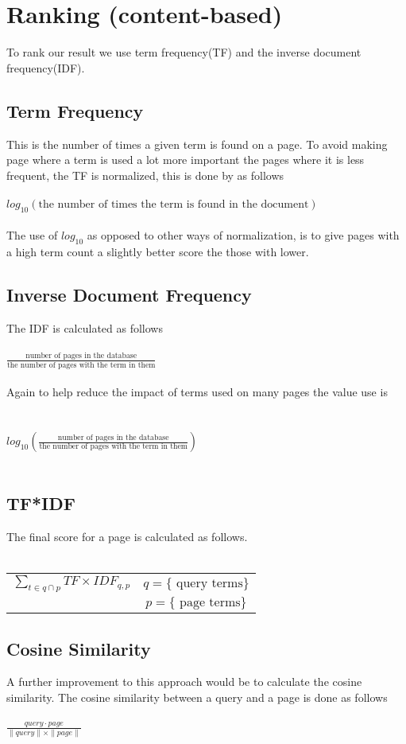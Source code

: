 \section{Ranking (content-based)}
To rank our result we use term frequency(TF) and the inverse document frequency(IDF).

\subsection{Term Frequency} This is the number of times a given term is found on a page. To avoid making page where a term is used a lot more important the pages where it is less frequent, the TF is normalized, this is done by as follows
\\
\\
$log_{10}(\text{the number of times the term is found in the document})$
\\
\\
 The use of $log_{10}$ as opposed to other ways of normalization, is to give pages with a high term count a slightly better score the those with lower.

\subsection{Inverse Document Frequency}
The IDF is calculated as follows
\\
\\
$\frac{ \text{number of pages in the database}}{ \text{the number of pages with the term in them}}$
\\
\\
Again to help reduce the impact of terms used on many pages the value use is\\
\\
\\
$log_{10}(\frac{ \text{number of pages in the database}}{ \text{the number of pages with the term in them}})$
\\
\\

\subsection{TF*IDF}
The final score for a page is calculated as follows.
\\
\\
\begin{tabular}{c|c}
$ \sum_{t\in q\cap p} TF \times IDF_{q,p}$ &$q = \lbrace \text{ query terms} \rbrace$\\ 
&$p = \lbrace \text{ page terms} \rbrace$\\
\end{tabular} 

\subsection{Cosine Similarity}
A further improvement to this approach would be to calculate the cosine similarity. The cosine similarity between a query and a page is done as follows\\
\\ 

$ \frac{query \cdot page}{\parallel query \parallel \times \parallel page \parallel}$ 



 